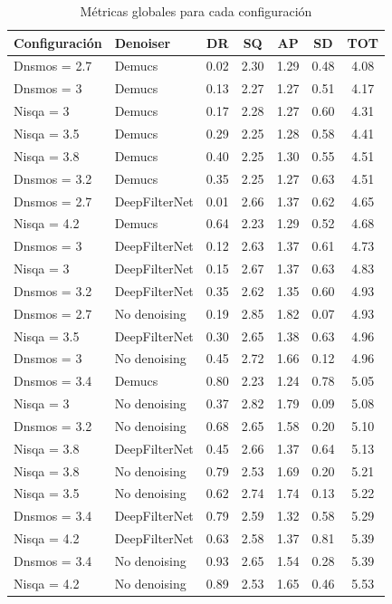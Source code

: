 \begin{table}[ht]
\centering
\small
\caption{Métricas globales para cada configuración}
\label{tab:metricas}
\begin{tabular}{@{} ll S S S S S @{}}
\toprule
Configuración & Denoiser & {DR} & {SQ} & {AP} & {SD} & {TOT} \\
\midrule
Dnsmos = 2.7  & Demucs          & 0.02 & 2.30 & 1.29 & 0.48 & 4.08 \\
Dnsmos = 3    & Demucs          & 0.13 & 2.27 & 1.27 & 0.51 & 4.17 \\
Nisqa = 3     & Demucs          & 0.17 & 2.28 & 1.27 & 0.60 & 4.31 \\
Nisqa = 3.5   & Demucs          & 0.29 & 2.25 & 1.28 & 0.58 & 4.41 \\
Nisqa = 3.8   & Demucs          & 0.40 & 2.25 & 1.30 & 0.55 & 4.51 \\
Dnsmos = 3.2  & Demucs          & 0.35 & 2.25 & 1.27 & 0.63 & 4.51 \\
Dnsmos = 2.7  & DeepFilterNet   & 0.01 & 2.66 & 1.37 & 0.62 & 4.65 \\
Nisqa = 4.2   & Demucs          & 0.64 & 2.23 & 1.29 & 0.52 & 4.68 \\
Dnsmos = 3    & DeepFilterNet   & 0.12 & 2.63 & 1.37 & 0.61 & 4.73 \\
Nisqa = 3     & DeepFilterNet   & 0.15 & 2.67 & 1.37 & 0.63 & 4.83 \\
Dnsmos = 3.2  & DeepFilterNet   & 0.35 & 2.62 & 1.35 & 0.60 & 4.93 \\
Dnsmos = 2.7  & No denoising    & 0.19 & 2.85 & 1.82 & 0.07 & 4.93 \\
Nisqa = 3.5   & DeepFilterNet   & 0.30 & 2.65 & 1.38 & 0.63 & 4.96 \\
Dnsmos = 3    & No denoising    & 0.45 & 2.72 & 1.66 & 0.12 & 4.96 \\
Dnsmos = 3.4  & Demucs          & 0.80 & 2.23 & 1.24 & 0.78 & 5.05 \\
Nisqa = 3     & No denoising    & 0.37 & 2.82 & 1.79 & 0.09 & 5.08 \\
Dnsmos = 3.2  & No denoising    & 0.68 & 2.65 & 1.58 & 0.20 & 5.10 \\
Nisqa = 3.8   & DeepFilterNet   & 0.45 & 2.66 & 1.37 & 0.64 & 5.13 \\
Nisqa = 3.8   & No denoising    & 0.79 & 2.53 & 1.69 & 0.20 & 5.21 \\
Nisqa = 3.5   & No denoising    & 0.62 & 2.74 & 1.74 & 0.13 & 5.22 \\
Dnsmos = 3.4  & DeepFilterNet   & 0.79 & 2.59 & 1.32 & 0.58 & 5.29 \\
Nisqa = 4.2   & DeepFilterNet   & 0.63 & 2.58 & 1.37 & 0.81 & 5.39 \\
Dnsmos = 3.4  & No denoising    & 0.93 & 2.65 & 1.54 & 0.28 & 5.39 \\
Nisqa = 4.2   & No denoising    & 0.89 & 2.53 & 1.65 & 0.46 & 5.53 \\
\bottomrule
\end{tabular}
\end{table}


